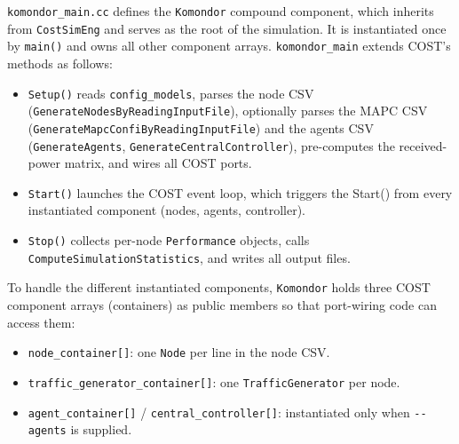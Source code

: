 \documentclass[11pt,a4paper]{article}
\begin{document}
\texttt{komondor\_main.cc} defines the \texttt{Komondor} compound component, which inherits from \texttt{CostSimEng} and serves as the root of the simulation.  It is instantiated once by \texttt{main()} and owns all other component arrays. \texttt{komondor\_main} extends COST's methods as follows:
\begin{itemize}
    \item \texttt{Setup()} reads \texttt{config\_models}, parses the node CSV (\texttt{GenerateNodesByReadingInputFile}), optionally parses the MAPC CSV (\texttt{GenerateMapcConfiByReadingInputFile}) and the agents CSV (\texttt{GenerateAgents}, \texttt{GenerateCentralController}), pre-computes the received-power matrix, and wires all COST ports.
    \item \texttt{Start()} launches the COST event loop, which triggers the Start() from every instantiated component (nodes, agents, controller).
    \item \texttt{Stop()} collects per-node \texttt{Performance} objects, calls \texttt{ComputeSimulationStatistics}, and writes all output files.
\end{itemize}

To handle the different instantiated components, \texttt{Komondor} holds three COST component arrays (containers) as public members so that port-wiring code can access them:
\begin{itemize}
    \item \texttt{node\_container[]}: one \texttt{Node} per line in the node CSV.
    \item \texttt{traffic\_generator\_container[]}: one \texttt{TrafficGenerator} per node.
    \item \texttt{agent\_container[]} / \texttt{central\_controller[]}: instantiated only when \texttt{-{}-agents} is supplied.
\end{itemize}
\end{document}
